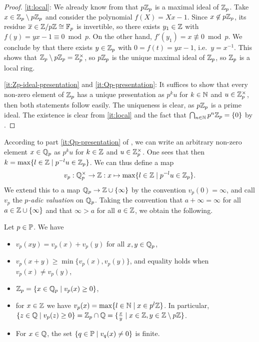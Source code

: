 \documentclass[12pt, leqno, british]{amsart}
\begin{document}
\begin{proof}
\eqref{it:local}: We already know from  that $p\mathbb Z_p$ is a maximal ideal of $\mathbb Z_p$.
Take $x \in \mathbb Z_p \setminus p\mathbb Z_p$ and consider the polynomial $f(X) = Xx - 1$.
Since $x \not\in p\mathbb Z_p$, its residue $\overline{x} \in \mathbb Z/p\mathbb Z \cong \mathbb F_p$ is invertible, so there exists $y_1 \in \mathbb Z$ with $f(y) = yx - 1 \equiv 0 \bmod p$.
On the other hand, $f'(y_1) = x \not\equiv 0 \bmod p$.
We conclude by  that there exists $y \in \mathbb Z_p$ with $0 = f(t) = yx - 1$, i.e.~$y = x^{-1}$.
This shows that $\mathbb Z_p \setminus p\mathbb Z_p = \mathbb Z_p^{\times}$, so $p\mathbb Z_p$ is the unique maximal ideal of $\mathbb Z_p$, so $\mathbb Z_p$ is a local ring.

\eqref{it:Zp-ideal-presentation} and \eqref{it:Qp-presentation}: It suffices to show that every non-zero element of $\mathbb Z_p$ has a unique presentation as $p^k u$ for $k \in \mathbb N$ and $u \in \mathbb Z_p^\times$, then both statements follow easily.
The uniqueness is clear, as $p\mathbb Z_p$ is a prime ideal.
The existence is clear from \eqref{it:local} and the fact that $\bigcap_{n \in \mathbb N} p^n\mathbb Z_p = \lbrace 0 \rbrace$ by .
\end{proof}
According to part \eqref{it:Qp-presentation} of , we can write an arbitrary non-zero element $x \in \mathbb Q_p$ as $p^k u$ for $k \in \mathbb Z$ and $u \in \mathbb Z_p^\times$.
One sees that then $k = \max \lbrace l \in \mathbb Z \mid p^{-l} u \in \mathbb Z_p \rbrace$.
We can thus define a map
$$ v_p : \mathbb Q_p^\times \to \mathbb Z : x \mapsto \max \lbrace l \in \mathbb Z \mid p^{-l} u \in \mathbb Z_p \rbrace. $$
We extend this to a map $\mathbb Q_p \to \mathbb Z \cup \lbrace \infty \rbrace$ by the convention $v_p(0) = \infty$, and call $v_p$ the \emph{$p$-adic valuation} on $\mathbb Q_p$.
Taking the convention that $a + \infty = \infty$ for all $a \in \mathbb Z \cup \lbrace \infty \rbrace$ and that $\infty > a$ for all $a \in \mathbb Z$, we obtain the following.
\begin{prop}\label{P:p-adic-valuation}
Let $p \in \mathbb P$.
We have
\begin{itemize}
\item $v_p(xy) = v_p(x) + v_p(y)$ for all $x, y \in \mathbb Q_p$,
\item $v_p(x + y) \geq \min \lbrace v_p(x), v_p(y) \rbrace$, and equality holds when $v_p(x) \neq v_p(y)$,
\item $\mathbb Z_p = \lbrace x \in \mathbb Q_p \mid v_p(x) \geq 0 \rbrace$,
\item for $x \in \mathbb Z$ we have $v_p(x) = \max \lbrace l \in \mathbb N \mid x \in p^l\mathbb Z \rbrace$.
In particular, $\lbrace z \in \mathbb Q \mid v_p(z) \geq 0 \rbrace = \mathbb Z_p \cap \mathbb Q = \lbrace \frac{x}{y} \mid x \in \mathbb Z, y \in \mathbb Z \setminus p\mathbb Z \rbrace$.
\item For $x \in \mathbb Q$, the set $\lbrace q \in \mathbb P \mid v_q(x) \neq 0 \rbrace$ is finite.
\end{itemize}
\end{prop}
\end{document}
